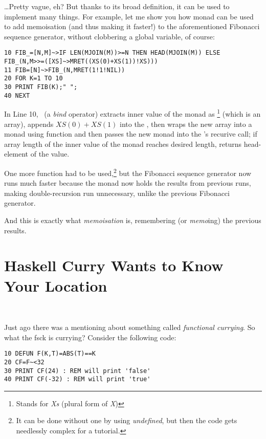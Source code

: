 \ldots Pretty vague, eh? But thanks to its broad definition, it can be used to implement many things. For example, let me show you how monad can be used to add memoisation (and thus making it faster!) to the aforementioned Fibonacci sequence generator, without clobbering a global variable, of course:

\begin{lstlisting}
10 FIB_=[N,M]~>IF LEN(MJOIN(M))>=N THEN HEAD(MJOIN(M)) ELSE FIB_(N,M>>=([XS]~>MRET((XS(0)+XS(1))!XS)))
11 FIB=[N]~>FIB_(N,MRET(1!1!NIL))
20 FOR K=1 TO 10
30 PRINT FIB(K);" ";
40 NEXT
\end{lstlisting}

In Line 10, \basicmbind\ (a \emph{bind} operator) extracts inner value of the monad  as \footnote{Stands for \emph{Xs} (plural form of \emph{X})} (which is an array), appends $XS(0) + XS(1)$ into the , then wraps the new array into a monad using  function and then passes the new monad into the 's recurive call; if array length of the inner value of the monad reaches desired length, returns head-element of the value.

One more function  had to be used,\footnote{It can be done without one by using \emph{undefined}, but then the code gets needlessly complex for a tutorial.} but the Fibonacci sequence generator now runs much faster because the monad now holds the results from previous runs, making double-recursion run unnecessary, unlike the previous Fibonacci generator.

And this is exactly what \emph{memoisation} is, remembering (or \emph{memo}ing) the previous results.

\section[Currying]{Haskell Curry Wants to Know Your Location}
\label{currying101}

\vspace*{-\mytextsize}\ \par %
Just \setcounter{curryingselfref}{\value{page} - \value{curryingappearance}} ago there was a mentioning about something called \emph{functional currying}. So what the fsck is currying? Consider the following code:

\begin{lstlisting}
10 DEFUN F(K,T)=ABS(T)==K
20 CF=F~<32
30 PRINT CF(24) : REM will print 'false'
40 PRINT CF(-32) : REM will print 'true'
\end{lstlisting}

